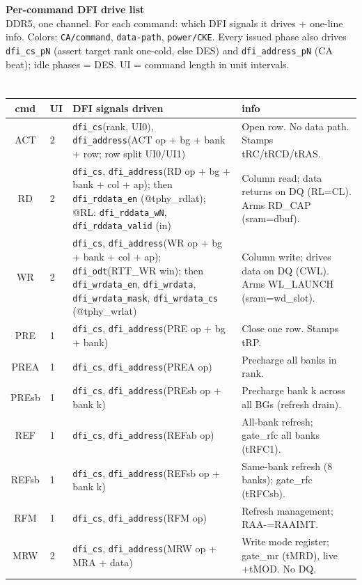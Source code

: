 \documentclass[9pt]{extarticle}
\newcommand{\ca}[1]{\textcolor{ccol}{\texttt{#1}}}
\newcommand{\dq}[1]{\textcolor{dcol}{\texttt{#1}}}
\newcommand{\pw}[1]{\textcolor{pcol}{\texttt{#1}}}
\newenvironment{drive}{%
  \footnotesize\begin{longtable}{C U G X}\toprule
  \textbf{cmd} & \textbf{UI} & \textbf{DFI signals driven} & \textbf{info}\\ \midrule\endhead}
  {\bottomrule\end{longtable}}
\begin{document}
\begin{center}
{\LARGE\textbf{Per-command DFI drive list}}\\[2pt]
{\small DDR5, one channel. For each command: which DFI signals it drives + one-line info.
Colors: \ca{CA/command}, \dq{data-path}, \pw{power/CKE}. Every issued phase also drives
\ca{dfi\_cs\_pN} (assert target rank one-cold, else DES) and \ca{dfi\_address\_pN} (CA beat);
idle phases = DES. UI = command length in unit intervals.}
\end{center}

\section*{}
\begin{drive}
ACT & 2 & \ca{dfi\_cs}(rank, UI0), \ca{dfi\_address}(ACT op + bg + bank + row; row split UI0/UI1)
   & Open row. No data path. Stamps tRC/tRCD/tRAS.\\
RD & 2 & \ca{dfi\_cs}, \ca{dfi\_address}(RD op + bg + bank + col + ap); then \dq{dfi\_rddata\_en}
   (@tphy\_rdlat); @RL: \dq{dfi\_rddata\_wN}, \dq{dfi\_rddata\_valid} (in)
   & Column read; data returns on DQ (RL=CL). Arms RD\_CAP (sram=dbuf).\\
WR & 2 & \ca{dfi\_cs}, \ca{dfi\_address}(WR op + bg + bank + col + ap); \pw{dfi\_odt}(RTT\_WR win);
   then \dq{dfi\_wrdata\_en}, \dq{dfi\_wrdata}, \dq{dfi\_wrdata\_mask}, \dq{dfi\_wrdata\_cs} (@tphy\_wrlat)
   & Column write; drives data on DQ (CWL). Arms WL\_LAUNCH (sram=wd\_slot).\\
PRE & 1 & \ca{dfi\_cs}, \ca{dfi\_address}(PRE op + bg + bank)
   & Close one row. Stamps tRP.\\
PREA & 1 & \ca{dfi\_cs}, \ca{dfi\_address}(PREA op)
   & Precharge all banks in rank.\\
PREsb & 1 & \ca{dfi\_cs}, \ca{dfi\_address}(PREsb op + bank k)
   & Precharge bank k across all BGs (refresh drain).\\
REF & 1 & \ca{dfi\_cs}, \ca{dfi\_address}(REFab op)
   & All-bank refresh; gate\_rfc all banks (tRFC1).\\
REFsb & 1 & \ca{dfi\_cs}, \ca{dfi\_address}(REFsb op + bank k)
   & Same-bank refresh (8 banks); gate\_rfc (tRFCsb).\\
RFM & 1 & \ca{dfi\_cs}, \ca{dfi\_address}(RFM op)
   & Refresh management; RAA-=RAAIMT.\\
MRW & 2 & \ca{dfi\_cs}, \ca{dfi\_address}(MRW op + MRA + data)
   & Write mode register; gate\_mr (tMRD), live +tMOD. No DQ.\\

\end{drive}
\end{document}

